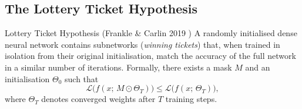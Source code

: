 %
%

\subsection{The Lottery Ticket Hypothesis}

\begin{theorem}{Lottery Ticket Hypothesis (Frankle \& Carlin 2019 \cite{frankle2018lottery})}{}
	A randomly initialised dense neural network contains subnetworks
	(\emph{winning tickets}) that, when trained in isolation from their
	original initialisation, match the accuracy of the full network in a
	similar number of iterations.  Formally, there exists a mask $M$ and an
	initialisation $\Theta_0$ such that
	\begin{equation}
		\mathcal{L}\bigl(f(x;\,M \odot \Theta_T)\bigr) \le
		\mathcal{L}\bigl(f(x;\,\Theta_T)\bigr),
		\label{eq:lth}
	\end{equation}
	where $\Theta_T$ denotes converged weights after $T$ training steps.
\end{theorem}

